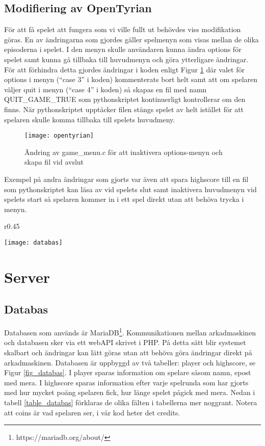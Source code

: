 \documentclass[12pt,fleqn,openany]{book} %
\begin{document}
\subsection{Modifiering av OpenTyrian}
För att få spelet att fungera som vi ville fullt ut behövdes viss modifikation göras. En av ändringarna som gjordes 
gäller spelmenyn som visas mellan de olika episoderna i spelet. I den menyn skulle användaren kunna ändra options för 
spelet samt kunna gå tillbaka till huvudmenyn och göra ytterligare ändringar. 
För att förhindra detta gjordes ändringar i koden enligt Figur \ref{fig_opentyrian} där valet för options i menyn 
(“case 3” i koden) kommenterats bort helt samt att om spelaren väljer quit i menyn (“case 4” i koden) så skapas en 
fil med namn QUIT\_GAME\_TRUE som pythonskriptet kontinuerligt kontrollerar om den finns. När pythonskriptet upptäcker 
filen stängs spelet av helt istället för att spelaren skulle komma tillbaka till spelets huvudmeny.

\begin{figure}[!h]
\texttt{[image: opentyrian]}
\caption{Ändring av game\_menu.c för att inaktivera options-menyn och skapa fil vid avslut}
\label{fig_opentyrian}
\end{figure}
Exempel på andra ändringar som gjorts var även att spara highscore till en fil som pythonskriptet kan läsa av vid 
spelets slut samt inaktivera huvudmenyn vid spelets start så spelaren kommer in i ett spel direkt utan att behöva 
trycka i menyn.

\begin{wrapfigure}{r}{0.45\textwidth}
  \begin{center}
    \texttt{[image: databas]}
  \end{center}
  \caption{Databastabeller}
  \label{fig_databas}
\end{wrapfigure}

\section{Server}
\subsection{Databas}

Databasen som används är MariaDB\footnote{https://mariadb.org/about/}. Kommunikationen mellan arkadmaskinen och databasen 
sker via ett webAPI skrivet i PHP. På detta sätt blir systemet skalbart och ändringar kan lätt göras utan att behöva göra 
ändringar direkt på arkadmaskinen. Databasen är uppbyggd av två tabeller: player och highscore, se Figur \ref{fig_databas}.
\clearpage
I player sparas information om spelare såsom namn, epost med mera. I highscore sparas information efter varje spelrunda som
har gjorts med hur mycket poäng spelaren fick, hur länge spelet pågick med mera. Nedan i tabell \ref{table_databas} förklaras de olika fälten
i tabellerna mer noggrant. Notera att coins är vad spelaren ser, i vår kod heter det credits.
\end{document}
